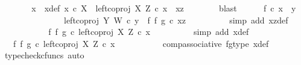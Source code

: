 \begin{isabellebody}
\ \ \ \ \isamarkupfalse%
\ \isamarkupfalse%
\ x\ \ x{\isacharunderscore}{\kern0pt}def{\isacharcolon}{\kern0pt}\ {\isachardoublequoteopen}x\ {\isasymin}\isactrlsub c\ X\ {\isasymand}\ left{\isacharunderscore}{\kern0pt}coproj\ X\ Z\ {\isasymcirc}\isactrlsub c\ x\ {\isacharequal}{\kern0pt}\ xz{\isachardoublequoteclose}\isanewline
\ \ \ \ \ \ \isamarkupfalse%
\ blast\isanewline
\ \ \ \ \isamarkupfalse%
\ {\isachardoublequoteopen}f\ {\isasymcirc}\isactrlsub c\ x\ {\isacharequal}{\kern0pt}\ y{\isachardoublequoteclose}\isanewline
\ \ \ \ \isamarkupfalse%
\ {\isacharminus}{\kern0pt}\ \isanewline
\ \ \ \ \ \ \isamarkupfalse%
\ {\isachardoublequoteopen}left{\isacharunderscore}{\kern0pt}coproj\ Y\ W\ {\isasymcirc}\isactrlsub c\ y\ {\isacharequal}{\kern0pt}\ {\isacharparenleft}{\kern0pt}f\ {\isasymbowtie}\isactrlsub f\ g{\isacharparenright}{\kern0pt}\ {\isasymcirc}\isactrlsub c\ xz{\isachardoublequoteclose}\isanewline
\ \ \ \ \ \ \ \ \isamarkupfalse%
\ {\isacharparenleft}{\kern0pt}simp\ add{\isacharcolon}{\kern0pt}\ xz{\isacharunderscore}{\kern0pt}def{\isacharparenright}{\kern0pt}\isanewline
\ \ \ \ \ \ \isamarkupfalse%
\ \isamarkupfalse%
\ {\isachardoublequoteopen}{\isachardot}{\kern0pt}{\isachardot}{\kern0pt}{\isachardot}{\kern0pt}\ {\isacharequal}{\kern0pt}\ {\isacharparenleft}{\kern0pt}f\ {\isasymbowtie}\isactrlsub f\ g{\isacharparenright}{\kern0pt}\ {\isasymcirc}\isactrlsub c\ left{\isacharunderscore}{\kern0pt}coproj\ X\ Z\ {\isasymcirc}\isactrlsub c\ x{\isachardoublequoteclose}\isanewline
\ \ \ \ \ \ \ \ \isamarkupfalse%
\ {\isacharparenleft}{\kern0pt}simp\ add{\isacharcolon}{\kern0pt}\ x{\isacharunderscore}{\kern0pt}def{\isacharparenright}{\kern0pt}\isanewline
\ \ \ \ \ \ \isamarkupfalse%
\ \isamarkupfalse%
\ {\isachardoublequoteopen}{\isachardot}{\kern0pt}{\isachardot}{\kern0pt}{\isachardot}{\kern0pt}\ {\isacharequal}{\kern0pt}\ {\isacharparenleft}{\kern0pt}{\isacharparenleft}{\kern0pt}f\ {\isasymbowtie}\isactrlsub f\ g{\isacharparenright}{\kern0pt}\ {\isasymcirc}\isactrlsub c\ left{\isacharunderscore}{\kern0pt}coproj\ X\ Z{\isacharparenright}{\kern0pt}\ {\isasymcirc}\isactrlsub c\ x{\isachardoublequoteclose}\isanewline
\ \ \ \ \ \ \ \ \isamarkupfalse%
\ \ comp{\isacharunderscore}{\kern0pt}associative{}\ fg{\isacharunderscore}{\kern0pt}type\ x{\isacharunderscore}{\kern0pt}def\ \isamarkupfalse%
\ {\isacharparenleft}{\kern0pt}typecheck{\isacharunderscore}{\kern0pt}cfuncs{\isacharcomma}{\kern0pt}\ auto{\isacharparenright}{\kern0pt}\isanewline

\end{isabellebody}
